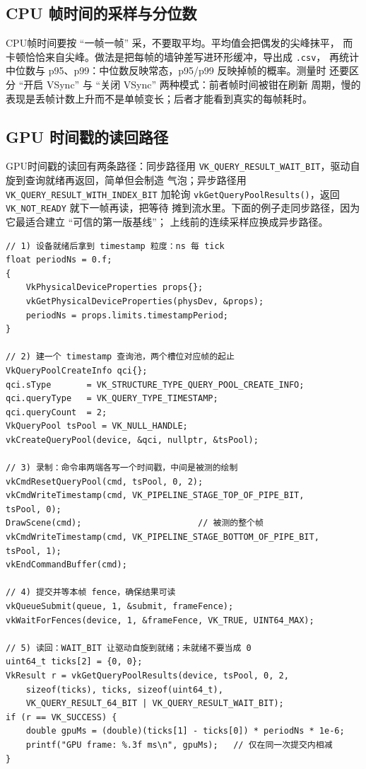 \documentclass[12pt,a4paper,fontset=fandol]{ctexbook}
\newcommand{\Fn}[1]{\texttt{#1()}}
\newcommand{\Tp}[1]{\texttt{#1}}
\newcommand{\Lang}[1]{\textsf{#1}}
\newcommand{\DomCPU}{\Lang{CPU}}
\newcommand{\DomGPU}{\Lang{GPU}}
\begin{document}
\subsection{CPU 帧时间的采样与分位数}

\DomCPU 帧时间要按 ``一帧一帧'' 采，不要取平均。平均值会把偶发的尖峰抹平，
而卡顿恰恰来自尖峰。做法是把每帧的墙钟差写进环形缓冲，导出成 \Tp{.csv}，
再统计中位数与 p95、p99：中位数反映常态，p95/p99 反映掉帧的概率。测量时
还要区分 ``开启 VSync'' 与 ``关闭 VSync'' 两种模式：前者帧时间被钳在刷新
周期，慢的表现是丢帧计数上升而不是单帧变长；后者才能看到真实的每帧耗时。

\subsection{GPU 时间戳的读回路径}

\DomGPU 时间戳的读回有两条路径：同步路径用
\Tp{VK\_QUERY\_RESULT\_WAIT\_BIT}，驱动自旋到查询就绪再返回，简单但会制造
气泡；异步路径用 \Tp{VK\_QUERY\_RESULT\_WITH\_INDEX\_BIT} 加轮询
\Fn{vkGetQueryPoolResults}，返回 \Tp{VK\_NOT\_READY} 就下一帧再读，把等待
摊到流水里。下面的例子走同步路径，因为它最适合建立 ``可信的第一版基线''；
上线前的连续采样应换成异步路径。

\begin{lstlisting}[style=cppstyle,caption={Vulkan GPU 时间戳的写入与读回（真实调用序列）},label={lst:ch14-timestamp}]
// 1) 设备就绪后拿到 timestamp 粒度：ns 每 tick
float periodNs = 0.f;
{
    VkPhysicalDeviceProperties props{};
    vkGetPhysicalDeviceProperties(physDev, &props);
    periodNs = props.limits.timestampPeriod;
}

// 2) 建一个 timestamp 查询池，两个槽位对应帧的起止
VkQueryPoolCreateInfo qci{};
qci.sType       = VK_STRUCTURE_TYPE_QUERY_POOL_CREATE_INFO;
qci.queryType   = VK_QUERY_TYPE_TIMESTAMP;
qci.queryCount  = 2;
VkQueryPool tsPool = VK_NULL_HANDLE;
vkCreateQueryPool(device, &qci, nullptr, &tsPool);

// 3) 录制：命令串两端各写一个时间戳，中间是被测的绘制
vkCmdResetQueryPool(cmd, tsPool, 0, 2);
vkCmdWriteTimestamp(cmd, VK_PIPELINE_STAGE_TOP_OF_PIPE_BIT,      tsPool, 0);
DrawScene(cmd);                       // 被测的整个帧
vkCmdWriteTimestamp(cmd, VK_PIPELINE_STAGE_BOTTOM_OF_PIPE_BIT,   tsPool, 1);
vkEndCommandBuffer(cmd);

// 4) 提交并等本帧 fence，确保结果可读
vkQueueSubmit(queue, 1, &submit, frameFence);
vkWaitForFences(device, 1, &frameFence, VK_TRUE, UINT64_MAX);

// 5) 读回：WAIT_BIT 让驱动自旋到就绪；未就绪不要当成 0
uint64_t ticks[2] = {0, 0};
VkResult r = vkGetQueryPoolResults(device, tsPool, 0, 2,
    sizeof(ticks), ticks, sizeof(uint64_t),
    VK_QUERY_RESULT_64_BIT | VK_QUERY_RESULT_WAIT_BIT);
if (r == VK_SUCCESS) {
    double gpuMs = (double)(ticks[1] - ticks[0]) * periodNs * 1e-6;
    printf("GPU frame: %.3f ms\n", gpuMs);   // 仅在同一次提交内相减
}
\end{lstlisting}
\end{document}
